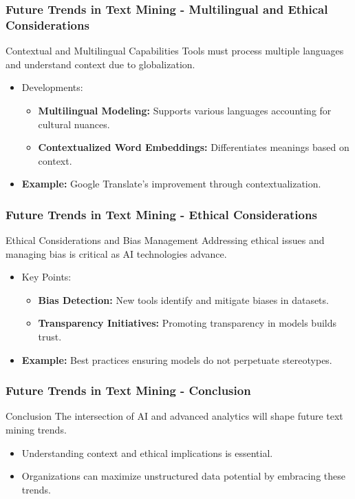 \documentclass[aspectratio=169]{beamer}
\begin{document}
\begin{frame}[fragile]
    \frametitle{Future Trends in Text Mining - Multilingual and Ethical Considerations}
    \begin{block}{Contextual and Multilingual Capabilities}
        Tools must process multiple languages and understand context due to globalization.
    \end{block}
    \begin{itemize}
        \item Developments:
        \begin{itemize}
            \item \textbf{Multilingual Modeling:} Supports various languages accounting for cultural nuances.
            \item \textbf{Contextualized Word Embeddings:} Differentiates meanings based on context.
        \end{itemize}
        \item \textbf{Example:} Google Translate's improvement through contextualization.
    \end{itemize}
\end{frame}

\begin{frame}[fragile]
    \frametitle{Future Trends in Text Mining - Ethical Considerations}
    \begin{block}{Ethical Considerations and Bias Management}
        Addressing ethical issues and managing bias is critical as AI technologies advance.
    \end{block}
    \begin{itemize}
        \item Key Points:
        \begin{itemize}
            \item \textbf{Bias Detection:} New tools identify and mitigate biases in datasets.
            \item \textbf{Transparency Initiatives:} Promoting transparency in models builds trust.
        \end{itemize}
        \item \textbf{Example:} Best practices ensuring models do not perpetuate stereotypes.
    \end{itemize}
\end{frame}

\begin{frame}[fragile]
    \frametitle{Future Trends in Text Mining - Conclusion}
    \begin{block}{Conclusion}
        The intersection of AI and advanced analytics will shape future text mining trends.
    \end{block}
    \begin{itemize}
        \item Understanding context and ethical implications is essential.
        \item Organizations can maximize unstructured data potential by embracing these trends.
    \end{itemize}
\end{frame}
\end{document}
